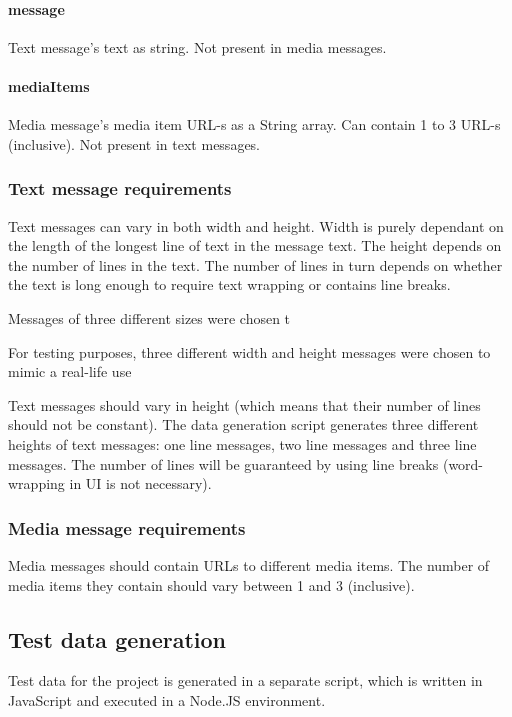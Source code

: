 \documentclass[a4paper,12pt]{article}
\begin{document}
\paragraph{message}
Text message's text as string. Not present in media messages.

\paragraph{mediaItems}
Media message's media item URL-s as a String array. Can contain 1 to 3 URL-s (inclusive). Not present in text messages.

\subsubsection*{Text message requirements}
Text messages can vary in both width and height. Width is purely dependant on the length of the longest line of text in
the message text. The height depends on the number of lines in the text. The number of lines in turn depends on whether
the text is long enough to require text wrapping or contains line breaks.

Messages of three different sizes were chosen t

For testing purposes, three different width and height messages were chosen to mimic a real-life use

Text messages should vary in height (which means that their number of lines should not be constant). The data generation
script generates three different heights of text messages: one line messages, two line messages and three line messages.
The number of lines will be guaranteed by using line breaks (word-wrapping in UI is not necessary).

\subsubsection*{Media message requirements}
Media messages should contain URLs to different media items. The number of media items they contain should vary between
1 and 3 (inclusive).

\subsection{Test data generation}
Test data for the project is generated in a separate script, which is written in JavaScript and executed in a
Node.JS environment.
\end{document}
